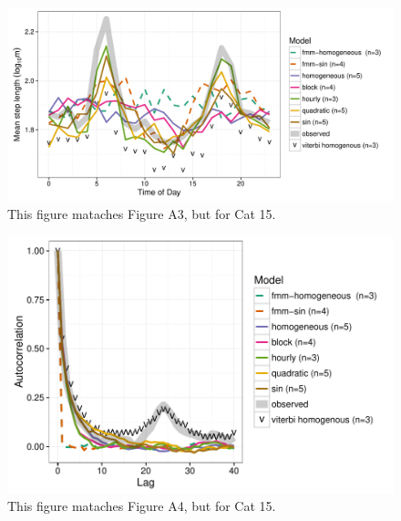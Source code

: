 \documentclass{article}\usepackage[]{graphicx}\usepackage{xcolor}
\makeatletter
\def\maxwidth{ %
  \ifdim\Gin@nat@width>\linewidth
    \linewidth
  \else
    \Gin@nat@width
  \fi
}
\newenvironment{knitrout}{}{} %
\makeatother
\begin{document}
\clearpage

\begin{knitrout}
\color{fgcolor}\begin{figure}
\includegraphics[width=\maxwidth]{figure/avg_step_length_by_time15-1} \caption{This figure mataches Figure A3, but for Cat 15.}\label{fig:avg_step_length_by_time15}
\end{figure}


\end{knitrout}

\clearpage

\begin{knitrout}
\color{fgcolor}\begin{figure}
\includegraphics[width=\maxwidth]{figure/acf_plot15-1} \caption{This figure mataches Figure A4, but for Cat 15.}\label{fig:acf_plot15}
\end{figure}

\clearpage

\end{knitrout}

\end{document}
